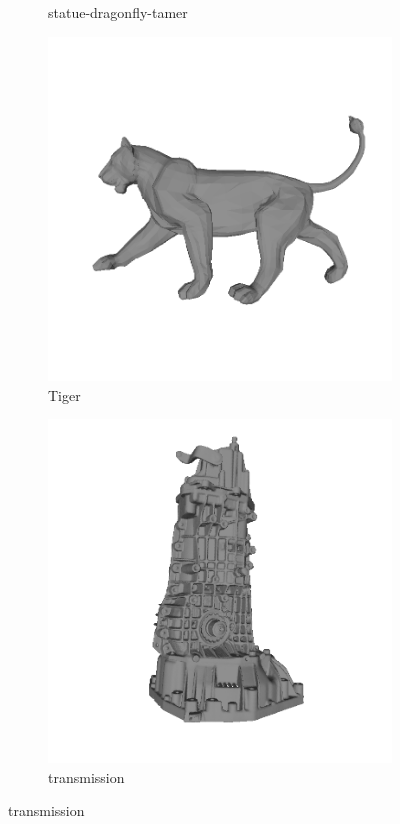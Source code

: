 \begin{figure}
\begin{subfigure}[b]{0.23\linewidth}
	\caption{statue-dragonfly-tamer}
\end{subfigure}
\begin{subfigure}[b]{0.23\linewidth}
	\includegraphics[width=\linewidth]{./Figures/train-dataset/38.tiger.png}
	\caption{Tiger}
\end{subfigure}
\begin{subfigure}[b]{0.23\linewidth}
	\includegraphics[width=\linewidth]{./Figures/train-dataset/39.transmission.png}
	\caption{transmission}
\end{subfigure}


\end{figure}
